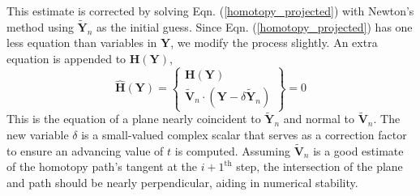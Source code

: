\documentclass[journal]{IEEEtran}
\begin{document}
This estimate is corrected by solving Eqn. (\ref{homotopy_projected}) with Newton's method using $\tilde{\mathbf{Y}}_n$ as the initial guess.  
Since Eqn. (\ref{homotopy_projected}) has one less equation than variables in $\mathbf{Y}$, we modify the process slightly.
An extra equation is appended to $\mathbf{H}(\mathbf{Y})$,
\begin{equation}
\hat{\mathbf{H}}(\mathbf{Y}) = 
\begin{Bmatrix}
\mathbf{H}(\mathbf{Y}) \\
\tilde{\mathbf{V}}_n \cdot (\mathbf{Y} - \delta \tilde{\mathbf{Y}}_n)
\end{Bmatrix} = 0 \label{homotopy_augmented}
\end{equation}
This is the equation of a plane nearly coincident to $\tilde{\mathbf{Y}}_n$ and normal to $\tilde{\mathbf{V}}_n$.  
The new variable $\delta$ is a small-valued complex scalar that serves as a correction factor to ensure an advancing value of $t$ is computed.
Assuming $\tilde{\mathbf{V}}_n$ is a good estimate of the homotopy path's tangent at the $i+1^\text{th}$ step, the intersection of the plane and path should be nearly perpendicular, aiding in numerical stability.

\end{document}
